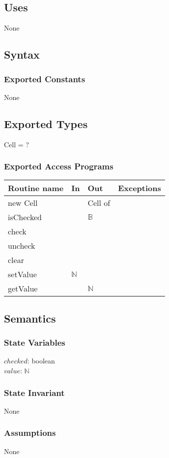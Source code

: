 \documentclass[12pt]{article}
\begin{document}
\subsection* {Uses}
None
\subsection* {Syntax}
\subsubsection* {Exported Constants}
None
\subsection* {Exported Types}
Cell = ?

\subsubsection* {Exported Access Programs}

\begin{tabular}{| l | l | l | p{6cm} |}
\hline
\textbf{Routine name} & \textbf{In} & \textbf{Out} & \textbf{Exceptions}\\
\hline
new Cell & & Cell of  & \\
\hline
isChecked & &  $\mathbb{B}$ & \\
\hline
check & && \\
\hline
uncheck & && \\
\hline
clear & && \\
\hline
setValue & $\mathbb{N}$ && \\
\hline
getValue & & $\mathbb{N}$& \\
\hline
\end{tabular}

\subsection* {Semantics}
\subsubsection*{State Variables}
$checked$: boolean\\
$value$: $\mathbb{N}$
\subsubsection* {State Invariant}
None

\subsubsection* {Assumptions}
None
\end{document}
